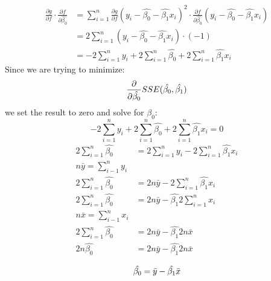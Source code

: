 \documentclass{article}
\begin{document}
\begin{align*}
\frac{\partial g}{\partial f}\cdot\frac{\partial f} {\partial \hat{\beta_0}} & = 
\sum_{i=1}^{n} \frac{\partial g}{\partial f} (y_i - \hat{\beta_{0}} - \hat{\beta_{1}}x_i)^2 \cdot \frac{\partial f} {\partial \hat{\beta_0}} (y_i - \hat{\beta_{0}} - \hat{\beta_{1}}x_i) \\
& = 2 \sum_{i=1}^{n} (y_i - \hat{\beta_{0}} - \hat{\beta_{1}}x_i) \cdot 
(-1) \\
& =  -2\sum_{i=1}^{n}y_i  + 2\sum_{i=1}^{n}\hat{\beta_{0}} + 2\sum_{i=1}^{n}\hat{\beta_{1}}x_i
\end{align*}
Since we are trying to minimize:
$$
\frac{\partial}{\partial \hat{\beta_0}}SSE(\hat{\beta_0}, \hat{\beta_1}) \\
$$
we set the result to zero and solve for $\hat{\beta_0}$:
$$
 -2\sum_{i=1}^{n}y_i  + 2\sum_{i=1}^{n}\hat{\beta_{0}} + 2\sum_{i=1}^{n}\hat{\beta_{1}}x_i  = 0 
$$
\begin{align*}
2\sum_{i=1}^{n}\hat{\beta_{0}} & =  2\sum_{i=1}^{n}y_i  -  2\sum_{i=1}^{n}\hat{\beta_{1}}x_i \\
n\bar{y} = \sum_{i - 1}^{n}y_i \\
2\sum_{i=1}^{n}\hat{\beta_{0}} & =  2n\bar{y}  -  2\sum_{i=1}^{n}\hat{\beta_{1}}x_i \\
2\sum_{i=1}^{n}\hat{\beta_{0}} & =  2n\bar{y}  -  \hat{\beta_{1}}2\sum_{i=1}^{n}x_i \\
n\bar{x} = \sum_{i - 1}^{n}x_i \\
2\sum_{i=1}^{n}\hat{\beta_{0}} & =  2n\bar{y}  -  \hat{\beta_{1}}2n\bar{x} \\
2n\hat{\beta_{0}} & =  2n\bar{y}  -  \hat{\beta_{1}}2n\bar{x} \\
\end{align*}
\begin{equation}
\hat{\beta_0} =  \bar{y} - \hat{\beta_1}\bar{x} \\ \label{eq:4}
\end{equation}
\end{document}
